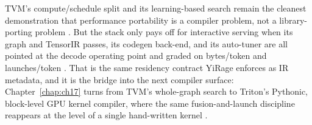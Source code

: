 TVM's compute/schedule split and its learning-based search remain the cleanest demonstration that performance portability is a compiler problem, not a library-porting problem \citep{chen2018tvm,zheng2020ansor}. But the stack only pays off for interactive serving when its graph and TensorIR passes, its codegen back-end, and its auto-tuner are all pointed at the decode operating point and graded on bytes/token and launches/token \citep{taxbreak2026,memoryfloor2026}. That is the same residency contract YiRage enforces as IR metadata, and it is the bridge into the next compiler surface: Chapter~\ref{chap:ch17} turns from TVM's whole-graph search to Triton's Pythonic, block-level GPU kernel compiler, where the same fusion-and-launch discipline reappears at the level of a single hand-written kernel \citep{yirage2026,dlbook}.

